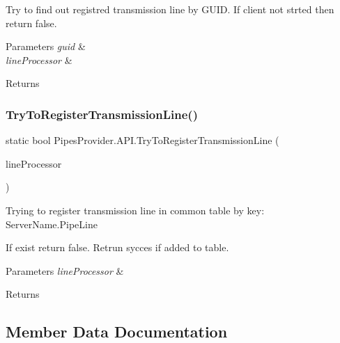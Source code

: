 Try to find out registred transmission line by G\+U\+ID. If client not strted then return false. 


\begin{DoxyParams}{Parameters}
{\em guid} & \\
\hline
{\em line\+Processor} & \\
\hline
\end{DoxyParams}
\begin{DoxyReturn}{Returns}

\end{DoxyReturn}
\mbox{\label{class_pipes_provider_1_1_a_p_i_a39e17f30d2ee8c716efeb92f947fb72e}} 
\subsubsection{\texorpdfstring{Try\+To\+Register\+Transmission\+Line()}{TryToRegisterTransmissionLine()}}
{\footnotesize\ttfamily static bool Pipes\+Provider.\+A\+P\+I.\+Try\+To\+Register\+Transmission\+Line (\begin{DoxyParamCaption}\item[{\mbox{\hyperlink{class_pipes_provider_1_1_transmission_line}{Transmission\+Line}}}]{line\+Processor }\end{DoxyParamCaption})\hspace{0.3cm}{\ttfamily [static]}}



Trying to register transmission line in common table by key\+: Server\+Name.\+Pipe\+Line 

If exist return false. Retrun sycces if added to table. 


\begin{DoxyParams}{Parameters}
{\em line\+Processor} & \\
\hline
\end{DoxyParams}
\begin{DoxyReturn}{Returns}

\end{DoxyReturn}


\subsection{Member Data Documentation}
\mbox{\label{class_pipes_provider_1_1_a_p_i_a8efe588e9c6f7bf610310d9f6223a0f8}} 
